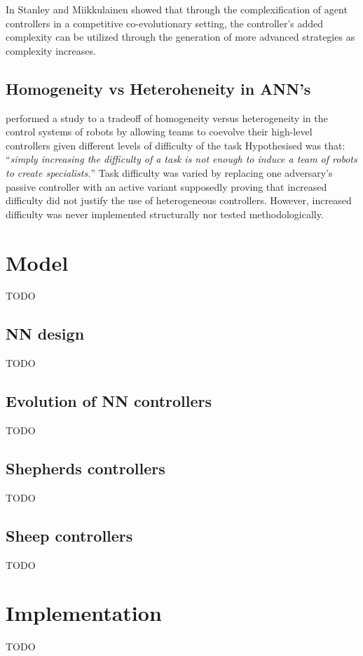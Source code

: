 \documentclass[conference]{IEEEtran}
\begin{document}
In \cite{stanley2004competitive} Stanley and Miikkulainen showed that through the complexification of agent controllers in a competitive co-evolutionary setting, the controller's added complexity can be utilized through the generation of more advanced strategies as complexity increases.


\subsection{Homogeneity vs Heteroheneity in ANN's}
\cite{potter2001heterogeneity} performed a study to a tradeoff of homogeneity versus heterogeneity in the control systems of robots by allowing teams to coevolve their high-level controllers given different levels of difficulty of the task
Hypothesised was that: ``\textit{simply increasing the difficulty of a task is not enough to induce a team of robots to create specialists.}''
Task difficulty was varied by replacing one adversary's passive controller with an active variant supposedly proving that increased difficulty did not justify the use of heterogeneous controllers.
However, increased difficulty was never implemented structurally nor tested methodologically. 



\section{Model}
TODO

\subsection{NN design}
TODO

\subsection{Evolution of NN controllers}
TODO

\subsection{Shepherds controllers}
TODO

\subsection{Sheep controllers}
TODO

\section{Implementation}
TODO
\end{document}

